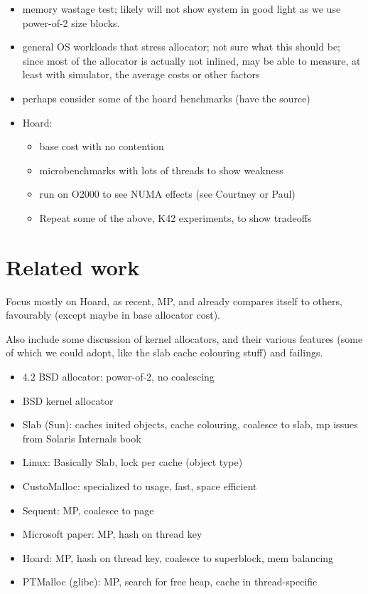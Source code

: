 \documentclass[dvips,11pt]{article}
\begin{document}
\begin{itemize}
\item memory wastage test; likely will not show system in good light as we
  use power-of-2 size blocks.
\item general OS workloads that stress allocator; not sure what this should
  be; since most of the allocator is actually not inlined, may be able to
  measure, at least with simulator, the average costs or other factors
\item perhaps consider some of the hoard benchmarks (have the source)
\item Hoard:
  \begin{itemize}
  \item base cost with no contention
  \item microbenchmarks with lots of threads to show weakness
  \item run on O2000 to see NUMA effects (see Courtney or Paul)
  \item Repeat some of the above, K42 experiments, to show tradeoffs
  \end{itemize}
\end{itemize}

\section{Related work}

Focus mostly on Hoard, as recent, MP, and already compares itself to
others, favourably (except maybe in base allocator cost).

Also include some discussion of kernel allocators, and their various
features (some of which we could adopt, like the slab cache colouring
stuff) and failings.

\begin{itemize}
\item 4.2 BSD allocator: power-of-2, no coalescing
\item BSD kernel allocator
\item Slab (Sun): caches inited objects, cache colouring, coalesce to slab, 
  mp issues from Solaris Internals book
\item Linux: Basically Slab, lock per cache (object type)
\item CustoMalloc: specialized to usage, fast, space efficient
\item Sequent: MP, coalesce to page
\item Microsoft paper: MP, hash on thread key
\item Hoard: MP, hash on thread key, coalesce to superblock, mem balancing
\item PTMalloc (glibc): MP, search for free heap, cache in thread-specific
\end{itemize}
\end{document}
